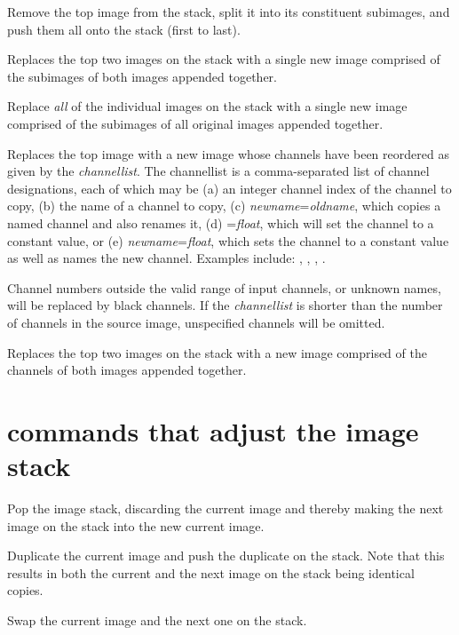 Remove the top image from the stack, split it into its constituent
subimages, and push them all onto the stack (first to last).
\apiend

Replaces the top two images on the stack with a single new image comprised
of the subimages of both images appended together.
\apiend

Replace \emph{all} of the individual images on the stack with a single new
image comprised of the subimages of all original images appended together.
\apiend

\label{sec:oiiotool:ch}
Replaces the top image with a new image whose channels have been
reordered as given by the \emph{channellist}.  The {\cf channellist}
is a comma-separated list of channel designations, each of which may be
(a) an integer channel index of the channel to copy,
(b) the name of a channel to copy,
(c) \emph{newname}{\cf =}\emph{oldname}, which copies a named channel and
also renames it,
(d) {\cf =}\emph{float}, which will set the channel to a constant value,
or
(e) \emph{newname}{\cf =}\emph{float},
which sets the channel to a constant value as well as names the new channel.
Examples include:  , , ,
.

Channel numbers outside the valid range of input channels, or unknown names,
will be replaced by black channels. If the \emph{channellist} is shorter
than the number of channels in the source image, unspecified channels will
be omitted.
\apiend

Replaces the top two images on the stack with a new image comprised of
the channels of both images appended together.
\apiend


\section{\oiiotool commands that adjust the image stack}

Pop the image stack, discarding the current image and thereby
making the next image on the stack into the new current image.
\apiend

Duplicate the current image and push the duplicate on the stack.
Note that this results in both the current and the next image 
on the stack being identical copies.
\apiend

Swap the current image and the next one on the stack.
\apiend

